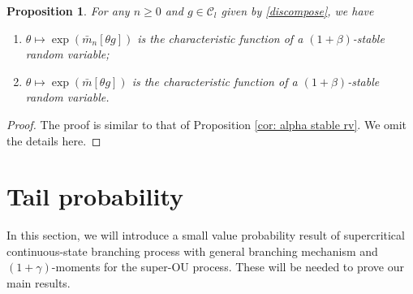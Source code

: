 \documentclass[12pt,a4paper]{amsart}
\theoremstyle{plain}
\newtheorem{prop}[thm]{Proposition}
\theoremstyle{definition}
\numberwithin{equation}{section}
\begin{document}
\begin{prop}
\label{cor: alpha stable rv 1}
For any $n\geq 0$ and $g\in \mathcal C_l$ given by \eqref{discompose}, we have
\begin{enumerate}
\item
\label{it: first stable}
    $\theta \mapsto \exp(\bar{m}_n[\theta g])$ is the characteristic function of a $(1+\beta)$-stable random variable;
\item
\label{it: second stable}
    $\theta \mapsto \exp(\bar m[\theta g])$ is the characteristic function of a $(1+\beta)$-stable random variable.
\end{enumerate}
\end{prop}
\begin{proof}
The proof is similar to that of Proposition \ref{cor: alpha stable rv}. We omit the details here.
\end{proof}

\section{Tail probability}
In this section, we will introduce a small value probability result of supercritical continuous-state branching process with general branching mechanism and %
$(1+\gamma)$-moments for the super-OU process. These will be needed to prove our main results.
\end{document}
